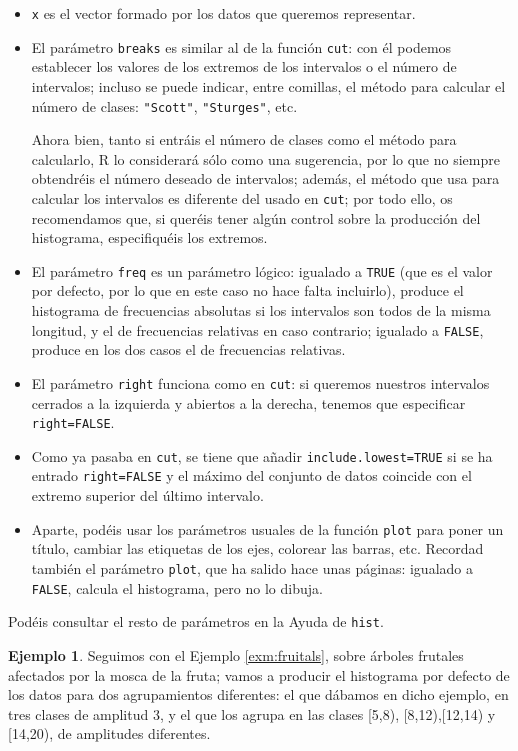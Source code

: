 \documentclass[
]{book}
\theoremstyle{definition}
\theoremstyle{definition}
\newtheorem{example}{Ejemplo}[chapter]
\theoremstyle{definition}
\theoremstyle{remark}
\begin{document}
\begin{itemize}
\item
  \texttt{x} es el vector formado por los datos que queremos representar.
\item
  El parámetro \texttt{breaks} es similar al de la función \texttt{cut}: con él podemos establecer los valores de los extremos de los intervalos o el número de intervalos; incluso se puede indicar, entre comillas, el método para calcular el número de clases: \texttt{"Scott"}, \texttt{"Sturges"}, etc.

  Ahora bien, tanto si entráis el número de clases como el método para calcularlo, R lo considerará sólo como una sugerencia, por lo que no siempre obtendréis el número deseado de intervalos; además, el método que usa para calcular los intervalos es diferente del usado en \texttt{cut}; por todo ello, os recomendamos que, si queréis tener algún control sobre la producción del histograma, especifiquéis los extremos.
\item
  El parámetro \texttt{freq} es un parámetro lógico: igualado a \texttt{TRUE} (que es el valor por defecto, por lo que en este caso no hace falta incluirlo), produce el histograma de frecuencias absolutas si los intervalos son todos de la misma longitud, y el de frecuencias relativas en caso contrario; igualado a \texttt{FALSE}, produce en los dos casos el de frecuencias relativas.
\item
  El parámetro \texttt{right} funciona como en \texttt{cut}: si queremos nuestros intervalos cerrados a la izquierda y abiertos a la derecha, tenemos que especificar \texttt{right=FALSE}.
\item
  Como ya pasaba en \texttt{cut}, se tiene que añadir \texttt{include.lowest=TRUE} si se ha entrado \texttt{right=FALSE} y el máximo del conjunto de datos coincide con el extremo superior del último intervalo.
\item
  Aparte, podéis usar los parámetros usuales de la función \texttt{plot} para poner un título, cambiar las etiquetas de los ejes, colorear las barras, etc. Recordad también el parámetro \texttt{plot}, que ha salido hace unas páginas: igualado a \texttt{FALSE}, calcula el histograma, pero no lo dibuja.
\end{itemize}

Podéis consultar el resto de parámetros en la Ayuda de \texttt{hist}.

\begin{example}
\protect\hypertarget{exm:frut-hist}{}{\label{exm:frut-hist} }Seguimos con el Ejemplo \ref{exm:fruitals}, sobre árboles frutales afectados por la mosca de la fruta;
vamos a producir el histograma por defecto de los datos para dos agrupamientos diferentes: el que dábamos en dicho ejemplo, en tres clases de amplitud 3, y el que los agrupa en las clases
{[}5,8), {[}8,12),{[}12,14) y {[}14,20),
de amplitudes diferentes.
\end{example}
\end{document}
